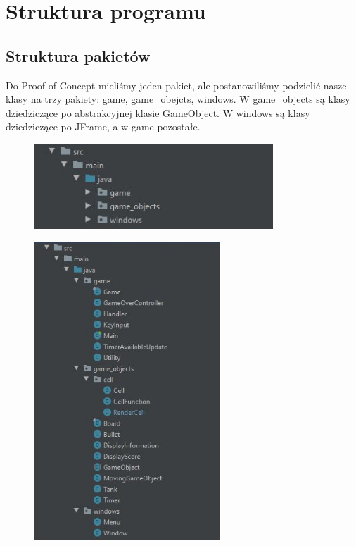 \documentclass{article}
\begin{document}
\section{Struktura programu}
\subsection{Struktura pakietów}

Do Proof of Concept mieliśmy jeden pakiet, ale postanowiliśmy podzielić nasze klasy na trzy pakiety: game, game\_obejcts, windows. W game\_objects są klasy dziedziczące po abstrakcyjnej klasie GameObject. W windows są klasy dziedziczące po JFrame, a w game pozostałe.

\begin{figure} [hbt!]
    \includegraphics[width=9cm,center]{images/pakiety.JPG}
\end{figure}

\clearpage

\begin{figure} [hbt!]
    \includegraphics[width=7cm,center]{images/klasy_w_pakietach.JPG}
\end{figure}
\end{document}

